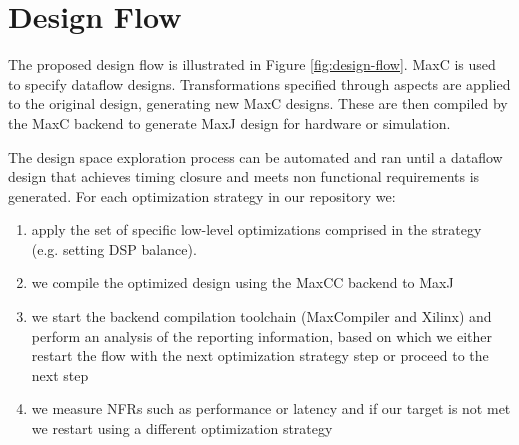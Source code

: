 \section{Design Flow}

The proposed design flow is illustrated in Figure
\ref{fig:design-flow}. MaxC is used to specify dataflow
designs. Transformations specified through aspects are applied to the
original design, generating new MaxC designs. These are then compiled
by the MaxC backend to generate MaxJ design for hardware or
simulation.

The design space exploration process can be automated and ran until a
dataflow design that achieves timing closure and meets non functional
requirements is generated.  For each optimization strategy in our
repository we:

\begin{enumerate}

\item apply the set of specific low-level optimizations comprised in
  the strategy (e.g. setting DSP balance).

\item  we compile the optimized
  design using the MaxCC backend to MaxJ

\item we start the backend compilation toolchain (MaxCompiler
  and Xilinx) and perform an analysis of the reporting information,
  based on which we either restart the flow with the next optimization
  strategy step or proceed to the next step

\item we measure NFRs such as performance or latency and if our target
  is not met we restart using a different optimization strategy

\end{enumerate}
